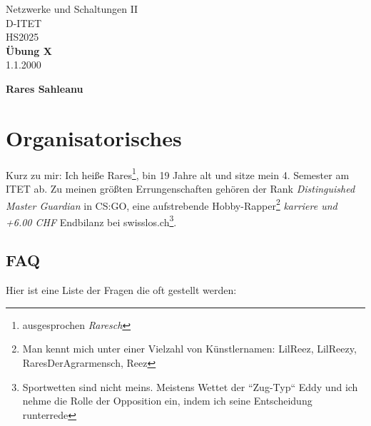 \documentclass[11pt,a4paper]{article}
\title{}
\date{}  %
\begin{document}
\begin{titlepage}
    \centering
    {\Huge Netzwerke und Schaltungen II}\\[0.8cm]
    {\Large D-ITET}\\[0.8cm]
    {\Large HS2025}\\[3.5cm]
    
    {\Huge \textbf{Übung X}}\\[1cm]
    {\Large 1.1.2000}\\[3.5cm]


    \vfill
    {\Large \textbf{Rares Sahleanu}}
\end{titlepage}


\newpage
\pagestyle{fancy}  


\fancyfoot[L]{}  
\fancyfoot[C]{\thepage}
\fancyfoot[R]{}

\renewcommand{\headrulewidth}{0.4pt}  
\renewcommand{\footrulewidth}{0pt}  

\section{Organisatorisches}
Kurz zu mir: Ich heiße Rares\footnote{ausgesprochen \textit{Raresch} \textipa{['ra:r\esh]}}, bin 19 Jahre alt und sitze mein 4. Semester am ITET ab. Zu meinen größten Errungenschaften gehören der Rank \textit{Distinguished Master Guardian} in CS:GO, eine aufstrebende Hobby-Rapper\footnote{Man kennt mich unter einer Vielzahl von Künstlernamen: LilReez, LilReezy, RaresDerAgrarmensch, Reez} \textit{karriere und +6.00 CHF} Endbilanz bei swisslos.ch\footnote{Sportwetten sind nicht meins. Meistens Wettet der ``Zug-Typ`` Eddy und ich nehme die Rolle der Opposition ein, indem ich seine Entscheidung runterrede}. 

\subsection{FAQ}
Hier ist eine Liste der Fragen die oft gestellt werden:
\end{document}
